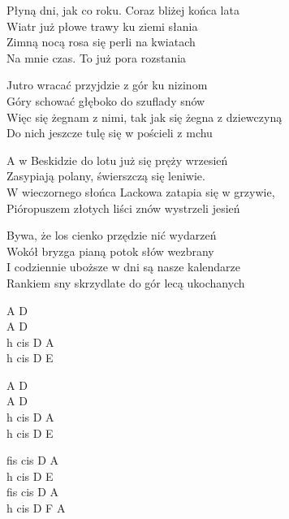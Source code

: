 \begin{text}
    Płyną dni, jak co roku. Coraz bliżej końca lata\\
    Wiatr już płowe trawy ku ziemi słania\\
    Zimną nocą rosa się perli na kwiatach\\
    Na mnie czas. To już pora rozstania

    Jutro wracać przyjdzie z gór ku nizinom\\
    Góry schować głęboko do szuflady snów\\
    Więc się żegnam z nimi, tak jak się żegna z dziewczyną\\
    Do nich jeszcze tulę się w pościeli z mchu

    A w Beskidzie do lotu już się pręży wrzesień\\
    Zasypiają polany, świerszczą się leniwie.\\
    W wieczornego słońca Lackowa zatapia się w grzywie,\\
    Pióropuszem złotych liści znów wystrzeli jesień

    Bywa, że los cienko przędzie nić wydarzeń\\
    Wokół bryzga pianą potok słów wezbrany\\
    I codziennie uboższe w dni są nasze kalendarze\\
    Rankiem sny skrzydlate do gór lecą ukochanych
\end{text}
\begin{chord}
    A D\\
    A D\\
    h cis D A\\
    h cis D E

    A D\\
    A D\\
    h cis D A\\
    h cis D E

    fis cis D A\\
    h cis D E\\
    fis cis D A\\
    h cis D F A
\end{chord}